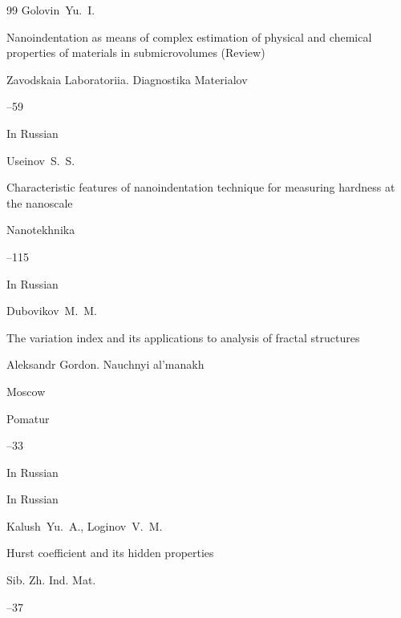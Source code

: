 \begin{thebibliography}{99}
\by Golovin~Yu.~I.

\paper  Nanoindentation as means of complex estimation of physical and chemical properties of materials in submicrovolumes (Review)

\jour Zavodskaia Laboratoriia. Diagnostika Materialov




--59

\lang In Russian






\by Useinov~S.~S.

\paper Characteristic features of nanoindentation technique for measuring hardness at the nanoscale

\jour Nanotekhnika



--115

\lang In Russian






\by Dubovikov~M.~M.

\paper The variation index and its applications to analysis of fractal structures

\inbook Aleksandr Gordon. Nauchnyi al'manakh



\publaddr Moscow

\publ Pomatur

--33

\lang In Russian




\lang In Russian

\by Kalush~Yu.~A., Loginov~V.~M.

\paper Hurst coefficient and its hidden properties

\jour Sib. Zh. Ind. Mat.




--37





\end{thebibliography}
